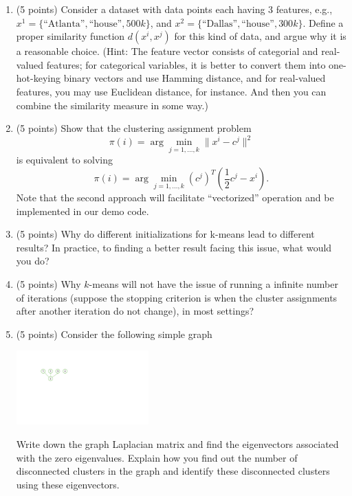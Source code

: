 \documentclass[twoside,10pt]{article}
\begin{document}
\begin{enumerate}


\item (5 points) Consider a dataset with data points each having 3 features, e.g., $x^1 = \{\mbox{``Atlanta''}, \mbox{``house''}, 500k\}$, and $x^2 = \{\mbox{``Dallas''}, \mbox{``house''}, 300k\}$. Define a proper similarity function $d(x^i, x^j)$ for this kind of data, and argue why it is a reasonable choice. (Hint: The feature vector consists of categorial and real-valued features; for categorical variables, it is better to convert them into one-hot-keying binary vectors and use Hamming distance, and for real-valued features, you may use Euclidean distance, for instance. And then you can combine the similarity measure in some way.)

\item (5 points) Show that the clustering assignment problem 
\[
\pi(i) = \arg\min_{j=1, \ldots, k} \|x^i- c^j\|^2
\]
is equivalent to solving
\[
\pi(i) = \arg \min_{j=1, \ldots, k} (c^j)^T\left(\frac 1 2 c^j-x^i\right).
\]
Note that the second approach will facilitate ``vectorized'' operation and be implemented in our demo code. 



\item (5 points) Why do different initializations for k-means lead to different results? In practice, to finding a better result facing this issue, what would you do?

\item (5 points) Why $k$-means will not have the issue of running a infinite number of iterations (suppose the stopping criterion is when the cluster assignments after another iteration do not change), in most settings?

\item (5 points) Consider the following simple graph
\begin{center}
\includegraphics[width = 0.4\textwidth]{diag_ver2.pdf}
\end{center}

Write down the graph Laplacian matrix and find the eigenvectors associated with the zero eigenvalues. Explain how you find out the number of disconnected clusters in the graph and identify these disconnected clusters using these eigenvectors.

\end{enumerate}
\end{document}
